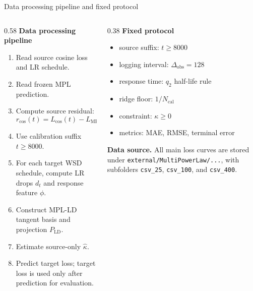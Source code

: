 \documentclass[9pt,aspectratio=169]{beamer}
\newcommand{\code}[1]{\texttt{\small #1}}
\newcommand{\tightlist}{\setlength{\itemsep}{2pt}\setlength{\parskip}{0pt}}
\begin{document}
\begin{frame}{Data processing pipeline and fixed protocol}
\small
\begin{columns}[T]
\begin{column}{0.58\textwidth}
\textbf{Data processing pipeline}
\begin{enumerate}\tightlist
\item Read source cosine loss and LR schedule.
\item Read frozen MPL prediction.
\item Compute source residual:
\[
r_{\cos}(t)=L_{\cos}(t)-L_{\mathrm{MPL},\cos}(t).
\]
\item Use calibration suffix \(t\ge8000\).
\item For each target WSD schedule, compute LR drops \(d_t\) and response feature \(\phi\).
\item Construct MPL-LD tangent basis and projection \(P_{\mathrm{LD}}\).
\item Estimate source-only \(\widehat\kappa\).
\item Predict target loss; target loss is used only after prediction for evaluation.
\end{enumerate}
\end{column}
\begin{column}{0.38\textwidth}
\textbf{Fixed protocol}
\begin{itemize}\tightlist
\item source suffix: \(t\ge8000\)
\item logging interval: \(\Delta_{\mathrm{obs}}=128\)
\item response time: \(q_2\) half-life rule
\item ridge floor: \(1/N_{\mathrm{cal}}\)
\item constraint: \(\kappa\ge0\)
\item metrics: MAE, RMSE, terminal error
\end{itemize}
\vfill
\textbf{Data source.}
All main loss curves are stored under
\code{external/MultiPowerLaw/...}, with subfolders
\code{csv\_25}, \code{csv\_100}, and \code{csv\_400}.
\end{column}
\end{columns}
\end{frame}
\end{document}
